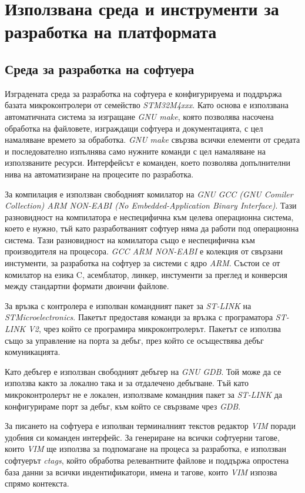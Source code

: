 \section{Използвана среда и инструменти за разработка на платформата}

\FloatBarrier
\subsection{Среда за разработка на софтуера}
\FloatBarrier

Изградената среда за разработка на софтуера е конфигурируема и поддрържа базата микроконтролери от семейство \textit{STM32M4xxx}.
Като основа е използвана автоматичната система за изгращане \textit{GNU make}, която позволява насочена обработка на файловете, изграждащи софтуера и
документацията, с цел намаляване времето за обработка. \textit{GNU make} свързва всички елементи от средата и последователно изпълнява само нужните
команди с цел намаляване на използваните ресурси. Интерфейсът е команден, което позволява допълнителни нива на автоматизиране на процесите по разработка.

За компилация е използван свободният комилатор на \textit{GNU} 
\textit{GCC (GNU Comiler Collection) ARM NON-EABI (No Embedded-Application Binary Interface)}. Тази разновидност на компилатора е неспецифична към
целева операционна система, което е нужно, тъй като разработваният софтуер няма да работи под операционна система. Тази разновидност на комилатора също е
неспецифична към производителя на процесора.
\textit{GCC ARM NON-EABI} е колекция от свързани инстументи, за разработка на софтуер за системи с ядро \textit{ARM}.
Състои се от комилатор на езика C, асемблатор, линкер, инстументи за преглед и конверсия между стандартни формати двоични файлове.

За връзка с контролера е изполван командният пакет за \textit{ST-LINK} на \textit{STMicroelectronics}.
Пакетът предоставя команди за връзка с програматора \textit{ST-LINK V2}, чрез който се програмира микроконтролерът.
Пакетът се използва също за управление на порта за дебъг, през който се осъществява дебъг комуникацията.

Като дебъгер е използван свободният дебъгер на \textit{GNU}
\textit{GDB}. Той може да се използва както за локално така и за отдалечено дебъгване.
Тъй като микроконтролерът не е локален, използваме командния пакет за \textit{ST-LINK} да конфигурираме порт за дебъг,
към който се свързваме чрез \textit{GDB}.

За писането на софтуера е изполван терминалният текстов редактор \textit{VIM} поради удобния си команден интерфейс.
За генериране на всички софтуерни тагове, които \textit{VIM} ще използва за подпомагане на процеса за разработка, 
е използван софтуерът \textit{ctags}, който обработва релевантните файлове и поддържа опростена база данни за всички индентификатори,
имена и тагове, които \textit{VIM} изпозва спрямо контекста.

